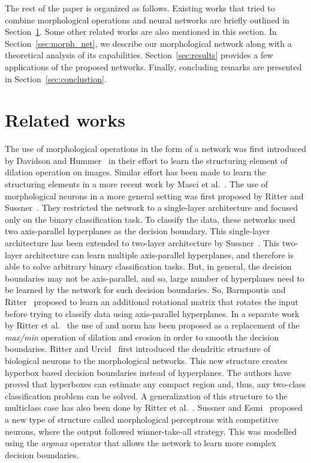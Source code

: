 \documentclass[12pt]{article}
\begin{document}
The rest of the paper is organized as follows. Existing works that tried to combine morphological operations and neural networks are briefly outlined in Section~\ref{sec:rel_work}. Some other related works are also mentioned in this section. In Section~\ref{sec:morph_net}, we describe our morphological network along with a theoretical analysis of its capabilities. Section~\ref{sec:results} provides a few applications of the proposed networks. Finally, concluding remarks are presented in Section~\ref{sec:conclustion}. 


\section{Related works}
\label{sec:rel_work}
The use of morphological operations in the form of a network was first introduced by Davidson and Hummer~\cite{davidson_morphology_1993} in their effort to learn the structuring element of dilation operation on images. Similar effort has been made to learn the structuring elements in a more recent work by Masci et al.~\cite{masci2013learning}. The use of morphological neurons in a more general setting was first proposed by Ritter and Sussner~\cite{ritter_introduction_1996}. They restricted the network to a single-layer architecture and focused only on the binary classification task. To classify the data, these networks used two axis-parallel hyperplanes as the decision boundary. This single-layer architecture has been extended to two-layer architecture by Sussner~\cite{sussner_morphological_1998}. This two-layer architecture can learn multiple axis-parallel hyperplanes, and therefore is able to solve arbitrary binary classification tasks. But, in general, the decision boundaries may not be axis-parallel, and so, large number of hyperplanes need to be learned by the network for such decision boundaries. So, 
Barmpoutis and Ritter~\cite{barmpoutis_orthonormal_2006} proposed to learn an additional rotational matrix that rotates the input before trying to classify data using axis-parallel hyperplanes. 
In a separate work by Ritter et al.~\cite{ritter_two_2014} the use of  and  norm has been proposed as a replacement of the \emph{max/min} operation of dilation and erosion in order to smooth the decision boundaries. 
Ritter and Urcid~\cite{ritter_lattice_2003} first introduced the dendritic structure of biological neurons to the morphological networks. This new structure creates hyperbox based decision boundaries instead of hyperplanes. The authors have proved that hyperboxes can estimate any compact region and, thus, any two-class classification problem can be solved. A generalization of this structure to the multiclass case has also been done by Ritter et al.~\cite{ritter_learning_2007}. Sussner and Esmi~\cite{sussner_morphological_2011} proposed a new type of structure called morphological perceptrons with competitive neurons, where the output followed winner-take-all strategy. This was modelled using the \emph{argmax} operator that allows the network to learn more complex decision boundaries.
\end{document}
